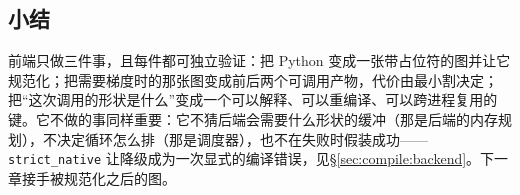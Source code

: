 \subsection{小结}

前端只做三件事，且每件都可独立验证：把 Python 变成一张带占位符的图并让它规范化；把需要梯度时的那张图变成前后两个可调用产物，代价由最小割决定；把“这次调用的形状是什么”变成一个可以解释、可以重编译、可以跨进程复用的键。它不做的事同样重要：它不猜后端会需要什么形状的缓冲（那是后端的内存规划），不决定循环怎么排（那是调度器），也不在失败时假装成功——\texttt{strict\_native} 让降级成为一次显式的编译错误，见\S\ref{sec:compile:backend}。下一章接手被规范化之后的图。